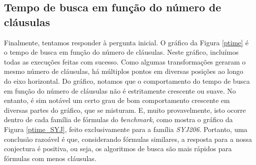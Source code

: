 \subsection{Tempo de busca em função do número de cláusulas}



\indent

Finalmente, tentamos responder à pergunta inicial. O gráfico da Figura \ref{ptime} é o tempo de busca em função do número de cláusulas. Neste gráfico, incluímos todas as execuções feitas com sucesso. Como algumas transformações geraram o mesmo número de cláusulas, há múltiplos pontos em diversas posições ao longo do eixo horizontal. Do gráfico, notamos que o comportamento do tempo de busca em função do número de cláusulas não é estritamente crescente ou suave. No entanto, é sim notável um certo grau de bom comportamento crescente em diversas partes do gráfico, que se misturam. E, muito provavelmente, isto ocorre dentro de cada família de fórmulas do \emph{benchmark}, como mostra o gráfico da Figura \ref{ptime_SYJ}, feito exclusivamente para a família \emph{SYJ206}. Portanto, uma conclusão razoável é que, considerando fórmulas similares, a resposta para a nossa conjectura é positiva, ou seja, os algoritmos de busca são mais rápidos para fórmulas com menos cláusulas.
